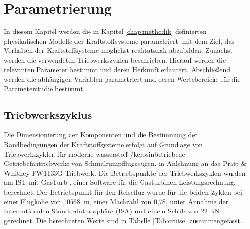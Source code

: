 \chapter{Parametrierung}
\label{chap:param}

In diesem Kapitel werden die in Kapitel \ref{chap:methodik} definierten physikalischen Modelle der Kraftstoffsysteme parametriert, mit dem Ziel, das Verhalten der Kraftstoffsysteme möglichst realitätsnah abzubilden. Zunächst werden die verwendeten Triebwerkszyklen beschrieben. Hierauf werden die relevanten Parameter bestimmt und deren Herkunft erläutert. Abschließend werden die abhängigen Variablen parametriert und deren Wertebereiche für die Parameterstudie bestimmt.

\section{Triebwerkszyklus}

Die Dimensionierung der Komponenten und die Bestimmung der Randbedingungen der Kraftstoffsysteme erfolgt auf Grundlage von Triebwerkszyklen für moderne wasserstoff-/kerosinbetriebene Getriebefantriebwerke von Schmalrumpfflugzeugen, in Anlehnung an das Pratt \& Whitney PW1133G Triebwerk. Die Betriebspunkte der Triebwerkszyklen wurden am IST mit GasTurb \cite{GasTurbGmbH.2021}, einer Software für die Gasturbinen-Leistungsrechnung, berechnet. Der Betriebspunkt für den Reiseflug wurde für die beiden Zyklen bei einer Flughöhe von \SI{10668}{\m}, einer Machzahl von 0,78, unter Annahme der Internationalen Standardatmosphäre (ISA) und einem Schub von \SI{22}{\kilo\N} gerechnet. Die berechneten Werte sind in Tabelle \ref{Tab:cruise} zusammengefasst.

